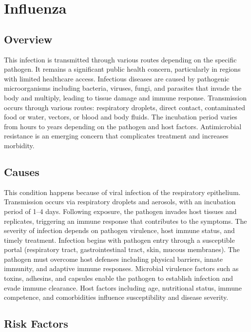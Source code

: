 \chapter{Influenza}
\label{sec:Influenza}

\section{Overview}
This infection is transmitted through various routes depending on the specific pathogen. It remains a significant public health concern, particularly in regions with limited healthcare access. Infectious diseases are caused by pathogenic microorganisms including bacteria, viruses, fungi, and parasites that invade the body and multiply, leading to tissue damage and immune response. Transmission occurs through various routes: respiratory droplets, direct contact, contaminated food or water, vectors, or blood and body fluids. The incubation period varies from hours to years depending on the pathogen and host factors. Antimicrobial resistance is an emerging concern that complicates treatment and increases morbidity.
\section{Causes}
This condition happens because of viral infection of the respiratory epithelium. Transmission occurs via respiratory droplets and aerosols, with an incubation period of 1--4 days. Following exposure, the pathogen invades host tissues and replicates, triggering an immune response that contributes to the symptoms. The severity of infection depends on pathogen virulence, host immune status, and timely treatment. Infection begins with pathogen entry through a susceptible portal (respiratory tract, gastrointestinal tract, skin, mucous membranes). The pathogen must overcome host defenses including physical barriers, innate immunity, and adaptive immune responses. Microbial virulence factors such as toxins, adhesins, and capsules enable the pathogen to establish infection and evade immune clearance. Host factors including age, nutritional status, immune competence, and comorbidities influence susceptibility and disease severity.
\section{Risk Factors}

